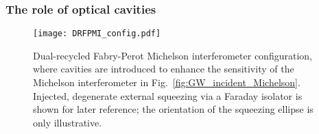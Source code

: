 
\subsubsection{The role of optical cavities}

\begin{figure}
	\centering
	\texttt{[image: DRFPMI\_config.pdf]}
	\caption{Dual-recycled Fabry-Perot Michelson interferometer configuration, where cavities are introduced to enhance the sensitivity of the Michelson interferometer in Fig.~\ref{fig:GW_incident_Michelson}. Injected, degenerate external squeezing via a Faraday isolator is shown for later reference; the orientation of the squeezing ellipse is only illustrative.}
	\label{fig:DRFPMI}
\end{figure}

